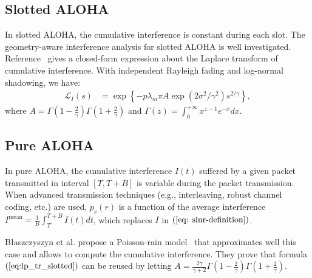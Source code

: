 \subsection{Slotted ALOHA}
In slotted ALOHA, the cumulative interference is constant during each slot. The geometry-aware interference analysis for slotted ALOHA is well investigated. Reference~\cite{haenggi2009interference} gives a closed-form expression about the Laplace transform of cumulative interference. With independent Rayleigh fading and log-normal shadowing, we have:
\begin{align}
\label{eq:lp_tr_slotted}
\mathcal{L}_{I}\left( s \right)  &=\exp \left\lbrace
-p\lambda_m \pi A  \exp \left( 2\sigma^2/\gamma^2\right) s^{2/\gamma}  
\right\rbrace,
\end{align}
where $A = \Gamma(1-\frac{2}{\gamma})\Gamma(1+\frac{2}{\gamma})$ and $\Gamma(z)=\int_{0}^{+\infty} x^{z-1} e^{-x} dx$. 
\subsection{Pure ALOHA}
\label{subsec: pure-aloha}
In pure ALOHA, the cumulative interference $I(t)$ suffered by a given packet transmitted in interval $\left[ T, T+B\right]$ is variable during the packet transmission. When advanced transmission techniques (e.g., interleaving, robust channel coding, etc.) are used, $p_{s}(r)$ is a function of the average interference $I^{\text{mean}} = \frac{1}{B}\int_{T}^{T+B} I(t)dt$, which replaces $I$ in $(\ref{eq: sinr-definition})$.

B{\l}aszczyszyn et al. propose a Poisson-rain model~\cite[Sec.2.4]{blaszczyszyn2015interference} that approximates well this case and allows to compute the cumulative interference. They prove that formula $(\ref{eq:lp_tr_slotted})$ can be reused by letting $A=\frac{2\gamma}{\gamma + 2} \Gamma(1-\frac{2}{\gamma})\Gamma(1+\frac{2}{\gamma})$.

